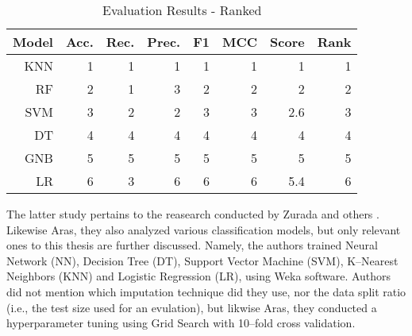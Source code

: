 \begin{table}[H]
    \small
    \setlength{\tabcolsep}{8pt}
    \renewcommand{\arraystretch}{1.3}
    \centering
    \caption[Evaluation Results - Ranked \citep{serkan2021bagging}]{Evaluation Results - Ranked \citep{serkan2021bagging}}\label{tab:serkanresultsranks}
    \begin{tabular}{r r r r r r r r}
    \toprule
    Model & Acc. & Rec. & Prec. & F1 & MCC & Score & Rank \\
    \midrule
    \hline
	
    KNN & 1 & 1 & 1 & 1 & 1 & 1 & 1 \\ 
    RF & 2 & 1 & 3 & 2 & 2 & 2 & 2 \\ 
    SVM & 3 & 2 & 2 & 3 & 3 & 2.6 & 3 \\ 
    DT & 4 & 4 & 4 & 4 & 4 & 4 & 4 \\ 
    GNB & 5 & 5 & 5 & 5 & 5 & 5 & 5 \\ 
    LR & 6 & 3 & 6 & 6 & 6 & 5.4 & 6 \\ 
	
    \hline
    \bottomrule
    \end{tabular}
    \vspace{0.35em}
    
    \vspace{-1em}
\end{table}


The latter study pertains to the reasearch conducted by Zurada and others \citep{zurada2014classification}. Likewise Aras, they also analyzed various classification models, but only relevant ones to this thesis are further discussed.
Namely, the authors trained Neural Network (NN), Decision Tree (DT), Support Vector Machine (SVM), K--Nearest Neighbors (KNN) and Logistic Regression (LR), using Weka software.
Authors did not mention which imputation technique did they use, nor the data split ratio (i.e., the test size used for an evulation), but likwise Aras, they conducted a hyperparameter tuning using Grid Search with 10--fold cross validation.

